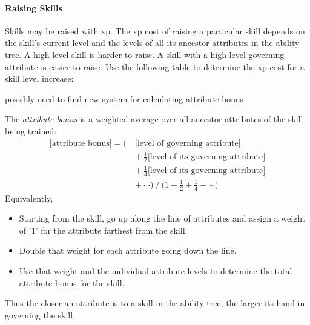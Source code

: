 \documentclass[12pt]{article}
\newcommand{\notes}[1]{{\color{Tan} #1}}
\begin{document}
\paragraph{Raising Skills}
Skills may be raised with xp.
The xp cost of raising a particular skill depends on
the skill's current level and the levels of all its ancestor attributes in the ability tree.
A high-level skill is harder to raise.
A skill with a high-level governing attribute is easier to raise.
Use the following table to determine the xp cost for a skill level increase:

\begin{center}
\resizebox{\columnwidth}{!}{

}
\end{center}

\notes{possibly need to find new system for calculating attribute bonus}

The \emph{attribute bonus} is a weighted average over all ancestor attributes of the skill being trained:
\begin{align*}
\textrm{[attribute bonus]}
=\big(\ &\textrm{[level of governing attribute]}\\
&+\ \frac{1}{2}\textrm{[level of its governing attribute]}\\
&+\ \frac{1}{4}\textrm{[level of its governing attribute]}\\
&+\ \cdots \big)
\ /\ \big(1+\frac{1}{2}+\frac{1}{4}+\cdots\big)
\end{align*}
Equivalently,
\vspace{-6mm}
\begin{itemize}
\item Starting from the skill, go up along the line of attributes
and assign a weight of '1' for the attribute farthest from the skill.
\item Double that weight for each attribute going down the line.
\item Use that weight and the individual attribute levels to determine the total attribute bonus for the skill.
\end{itemize}
\vspace{-6mm}
Thus the closer an attribute is to a skill in the ability tree, the larger its hand in governing the skill. 
\end{document}
